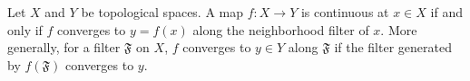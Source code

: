 Let $X$ and $Y$ be topological spaces. A map $f: X \to Y$ is continuous at $x \in X$ if and only if $f$ converges to $y = f(x)$ along the neighborhood filter of $x$. More generally, for a filter $\mathfrak{F}$ on $X$, $f$ converges to $y \in Y$ along $\mathfrak{F}$ if the filter generated by $f(\mathfrak{F})$ converges to $y$.
